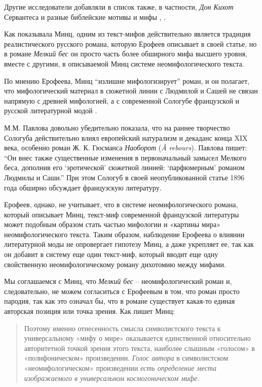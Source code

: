 \documentclass[12pt,a4paper]{article}
\begin{document}
Другие исследователи добавляли в список также, в частности, \emph{Дон Кихот} Сервантеса \parencite{bagno2009} и разные библейские мотивы и мифы \parencite{kobrinski2013}, \parencite[272]{silard1984}.



Как показывала Минц, одним из текст-мифов действительно является традиция реалистического русского романа, которую Ерофеев описывает в своей статье, но в романе \emph{Мелкий бес} он просто часть более обширного мифа высшего уровня, вместе с другими, в описываемой Минц системе неомифологического текста.


По мнению Ерофеева, Минц \enquote{излишне мифологизирует} роман, и он полагает, что мифологический материал в сюжетной линии с Людмилой и Сашей не связан напрямую с древней мифологией, а с современной Сологубе французской и русской литературной модой \parencite[152]{jerofeev1985}.

М.М. Павлова довольно убедительно показала, что на раннее творчество Сологуба действительно влиял европейский натурализм и декаданс конца XIX века, особенно роман Ж. К. Гюсманса \emph{Наоборот} (\emph{À rebours}). Павлова пишет: \enquote{Он внес также существенные изменения в первоначальный замысел \emph{}{Мелкого беса}, дополнив его \enquote{эротической} сюжетной линией: \enquote{парфюмерным} романом Людмилы и Саши.} \parencite[168.]{pavlova2007} При этом Сологуб в своей неопубликованной статье 1896 года  обширно обсуждает французскую литературу.

Ерофеев, однако, не учитывает, что в системе неомифологического романа, который описывает Минц, текст-миф современной французской литературы может подобным образом стать частью мифологии и «картины мира» неомифологического текста. Таким образом, наблюдение Ерофеева о влиянии литературной моды не опровергает гипотезу Минц, а даже укрепляет ее, так как он добавит в систему еще один текст-миф, который вводит еще одну свойственную неомифологическому роману дихотомию между мифами.

Мы соглашаемся с Минц, что \emph{Мелкий бес} -- неомифологический роман и, следовательно, не можем согласиться с Ерофеевым в том, что роман просто пародия, так как это означал бы, что в романе существует какая-то единая авторская позиция или точка зрения. Как пишет Минц:

\begin{quote}
Поэтому именно отнесенность смысла символистского текста к универсальному «мифу о мире» оказывается единственной относительно авторитетной точкой зрения этого текста, наиболее слышным «голосом» в «полифоническом» произведении. \emph{Голос автора} в символистском «неомифологическом» произведении \emph{есть определение места изображаемого в универсальном космогоническом мифе.}

\parencite[77.]{mints2004}
\end{quote}
\end{document}
